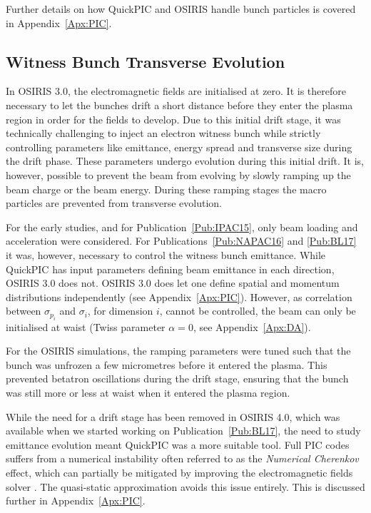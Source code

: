 Further details on how QuickPIC and OSIRIS handle bunch particles is covered in Appendix~\ref{Apx:PIC}.

\subsection{Witness Bunch Transverse Evolution}
\label{Sim:EBeam:TEvol}

In OSIRIS 3.0, the electromagnetic fields are initialised at zero.
It is therefore necessary to let the bunches drift a short distance before they enter the plasma region in order for the fields to develop.
Due to this initial drift stage, it was technically challenging to inject an electron witness bunch while strictly controlling parameters like emittance, energy spread and transverse size during the drift phase.
These parameters undergo evolution during this initial drift.
It is, however, possible to prevent the beam from evolving by slowly ramping up the beam charge or the beam energy.
During these ramping stages the macro particles are prevented from transverse evolution.

For the early studies, and for Publication~\ref{Pub:IPAC15}, only beam loading and acceleration were considered.
For Publications~\ref{Pub:NAPAC16} and \ref{Pub:BL17} it was, however, necessary to control the witness bunch emittance.
While QuickPIC has input parameters defining beam emittance in each direction, OSIRIS 3.0 does not.
OSIRIS 3.0 does let one define spatial and momentum distributions independently (see Appendix~\ref{Apx:PIC}).
However, as correlation between $\sigma_{p_{i}}$ and $\sigma_{i}$, for dimension $i$, cannot be controlled, the beam can only be initialised at waist (Twiss parameter $\alpha = 0$, see Appendix~\ref{Apx:DA}).

For the OSIRIS simulations, the ramping parameters were tuned such that the bunch was unfrozen a few micrometres before it entered the plasma.
This prevented betatron oscillations during the drift stage, ensuring that the bunch was still more or less at waist when it entered the plasma region.

While the need for a drift stage has been removed in OSIRIS 4.0, which was available when we started working on Publication~\ref{Pub:BL17}, the need to study emittance evolution meant QuickPIC was a more suitable tool.
Full PIC codes suffers from a numerical instability often referred to as the \textit{Numerical Cherenkov} effect, which can partially be mitigated by improving the electromagnetic fields solver \cite{lehe:2013}.
The quasi-static approximation avoids this issue entirely.
This is discussed further in Appendix~\ref{Apx:PIC}.

